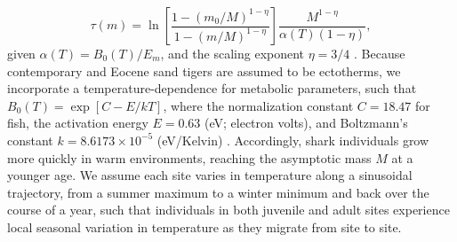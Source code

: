 \documentclass[]{rsos}%
\begin{document}
\begin{equation}
\label{t1}
\tau\left(m\right) = \ln\left[\frac{1-\left(m_{0}/M\right)^{1-\eta}}{1-(m/M)^{1-\eta}}\right]\frac{M^{1-\eta}}{\alpha(T)\left(1-\eta\right)},
\end{equation}
given $\alpha(T)=B_0(T)/E_m$, and the scaling exponent $\eta = 3/4$ \cite{yeakel2018dynamics}. 
Because contemporary and Eocene sand tigers are assumed to be ectotherms, we incorporate a temperature-dependence for metabolic parameters, such that $B_0(T) = \exp[C-E/kT]$, where the normalization constant $C=18.47$ for fish, the activation energy $E=0.63$ (eV; electron volts), and Boltzmann's constant $k=8.6173\times 10^{-5}$ (eV/Kelvin) \cite{Brown2004}. %
Accordingly, shark individuals grow more quickly in warm environments, reaching the asymptotic mass $M$ at a younger age.
We assume each site varies in temperature along a sinusoidal trajectory, from a summer maximum to a winter minimum and back over the course of a year, such that individuals in both juvenile and adult sites experience local seasonal variation in temperature as they migrate from site to site.

 
 
\end{document}
